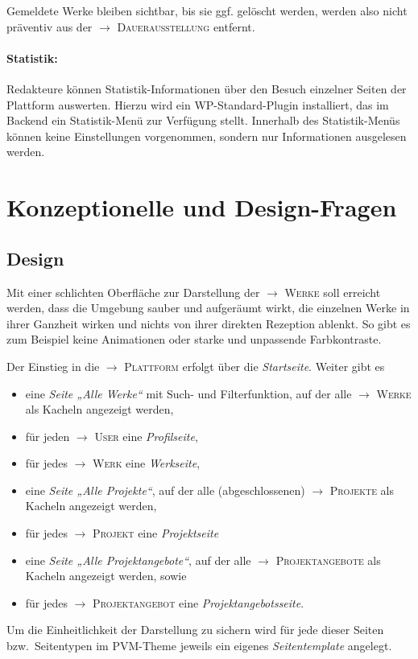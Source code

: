 \documentclass[a4paper,11pt]{article}
\newcommand{\glossar}[1]{{$\to$ \textsc{#1}}}
\begin{document}
Gemeldete Werke bleiben sichtbar, bis sie ggf. gelöscht werden, werden also
nicht präventiv aus der \glossar{Dauerausstellung} entfernt.

\paragraph{Statistik:} 
Redakteure können Statistik-Informationen über den Besuch einzelner Seiten der
Plattform auswerten.  Hierzu wird ein WP-Standard-Plugin installiert, das im
Backend ein Statistik-Menü zur Verfügung stellt.  Innerhalb des Statistik-Menüs
können keine Einstellungen vorgenommen, sondern nur Informationen ausgelesen
werden.

\section{Konzeptionelle und Design-Fragen}

\subsection{Design}

Mit einer schlichten Oberfläche zur Darstellung der \glossar{Werke} soll
erreicht werden, dass die Umgebung sauber und aufgeräumt wirkt, die einzelnen
Werke in ihrer Ganzheit wirken und nichts von ihrer direkten Rezeption ablenkt.
So gibt es zum Beispiel keine Animationen oder starke und unpassende
Farbkontraste.

Der Einstieg in die \glossar{Plattform} erfolgt über die \emph{Startseite}.
Weiter gibt es 
\begin{itemize}
\item eine \emph{Seite „Alle Werke“} mit Such- und Filterfunktion, auf der alle
  \glossar{Werke} als Kacheln angezeigt werden,
\item für jeden \glossar{User} eine \emph{Profilseite}, 
\item für jedes \glossar{Werk} eine \emph{Werkseite},
\item eine \emph{Seite „Alle Projekte“}, auf der alle (abgeschlossenen)
  \glossar{Projekte} als Kacheln angezeigt werden, 
\item für jedes \glossar{Projekt} eine \emph{Projektseite}
\item eine \emph{Seite „Alle Projektangebote“}, auf der alle
  \glossar{Projektangebote} als Kacheln angezeigt werden, sowie
\item für jedes \glossar{Projektangebot} eine \emph{Projektangebotsseite}. 
\end{itemize}
Um die Einheitlichkeit der Darstellung zu sichern wird für jede dieser Seiten
bzw.\ Seitentypen im PVM-Theme jeweils ein eigenes \emph{Seitentemplate}
angelegt.  
\end{document}
